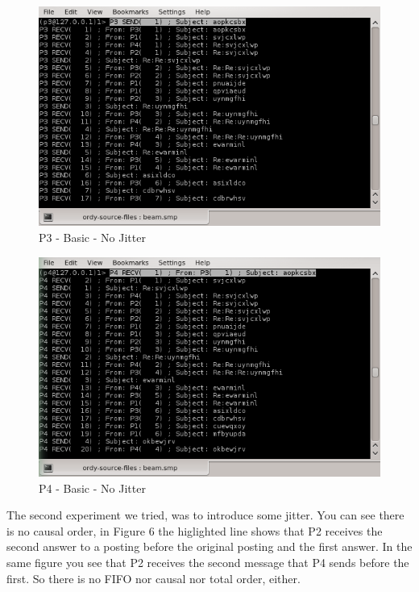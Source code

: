 \begin{figure}[h!]
\centering
\includegraphics[scale=0.8]{sections/screenshots/p3_basic_jitter0.png}
\caption{P3 - Basic - No Jitter}
\label{fig:p3_basic_no_jitter}
\end{figure}

\begin{figure}[h!]
\centering
\includegraphics[scale=0.8]{sections/screenshots/p4_basic_jitter0.png}
\caption{P4 - Basic - No Jitter}
\label{fig:p4_basic_no_jitter}
\end{figure}

\clearpage
The second experiment we tried, was to introduce some jitter. You can see there is no causal order, in Figure 6 the higlighted line shows that P2 receives the second answer to a posting before the original posting and the first answer. In the same figure you see that P2 receives the second message that P4 sends before the first. So there is  no FIFO nor causal nor total order, either.


